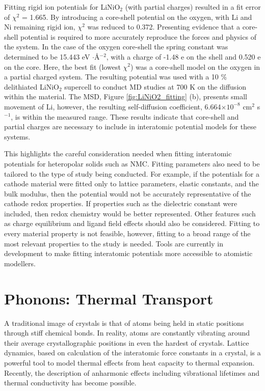 \documentclass[journal=jacsat,manuscript=article]{achemso}
\begin{document}
Fitting rigid ion potentials for LiNiO$_2$ (with partial charges) resulted in a fit error of $\chi^2$ = 1.665.
By introducing a core-shell potential on the oxygen, with Li and Ni remaining rigid ion, $\chi^2$ was reduced to 0.372. 
Presenting evidence that a core-shell potential is required to more accurately reproduce the forces and physics of the system.
In the case of the oxygen core-shell the spring constant was determined to be 15.443 eV $\cdot$\AA$^{-2}$, with a charge of -1.48 e on the shell and 0.520 e on the core.
Here, the best fit (lowest $\chi^2$) was a core-shell model on the oxygen in a partial charged system. The resulting potential was used with a 10 \% delithiated LiNiO$_2$ supercell to conduct MD studies at 700 K on the diffusion within the material.
The MSD, Figure \ref{fig:LiNiO2_fitting} (b), presents small movement of Li, however, the resulting self-diffusion coefficient, 6.664$\times 10^{-8}$  cm$^{2}$ s$^{-1}$, is within the measured range. \cite{Nakamura2000,bruce1992vacancy}
These results indicate that core-shell and partial charges are necessary to include in interatomic potential models for these systems. 

This highlights the careful consideration needed when fitting interatomic potentials for heteropolar solids such as NMC.
Fitting parameters also need to be tailored to the type of study being conducted.
For example, if the potentials for a cathode material were fitted only to lattice parameters, elastic constants, and the bulk modulus, then the potential would not be accurately representative of the cathode redox properties. 
If properties such as the dielectric constant were included, then redox chemistry would be better represented. 
Other features such as charge equilibrium and ligand field effects should also be considered. 
Fitting to every material property is not feasible, however, fitting to a broad range of the most relevant properties to the study is needed. 
Tools are currently in development to make fitting interatomic potentials more accessible to atomistic modellers. \cite{gale_empirical_1996, Stukowski_2017, wen_kim-compliant_2017, Morgan2020PopOff}

\section*{Phonons: Thermal Transport}
A traditional image of crystals is that of atoms being held in static positions through stiff chemical bonds. 
In reality, atoms are constantly vibrating around their average crystallographic positions in even the hardest of crystals. 
Lattice dynamics, based on calculation of the interatomic force constants in a crystal, is a powerful tool to model thermal effects from heat capacity to thermal expansion.
Recently, the description of anharmonic effects including vibrational lifetimes and thermal conductivity has become possible.
\end{document}
